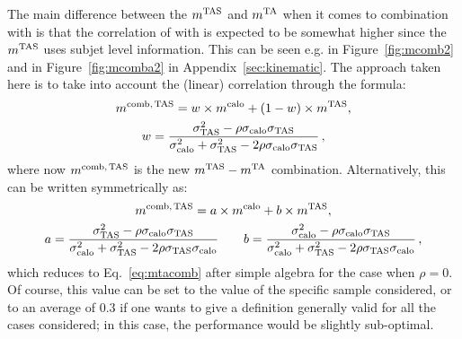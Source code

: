 The main difference between the $m^\textrm{TAS}$ and $m^\textrm{TA}$ when it comes to combination with \mcal is that the correlation of \mtas with \mcal is expected to be somewhat higher since the $m^\textrm{TAS}$ uses subjet level information. This can be seen e.g. in  Figure~\ref{fig:mcomb2} and in Figure~\ref{fig:mcomba2} in Appendix~\ref{sec:kinematic}. The approach taken here is to take into account the (linear) correlation through the formula:
\begin{equation}
\begin{gathered}
m^\textrm{comb,\,TAS}= w\times m^\textrm{calo} + (1-w)\times m^\textrm{TAS},\\
w=\frac{\sigma_\textrm{TAS}^2-\rho\sigma_\textrm{calo}\sigma_\textrm{TAS}}{\sigma_\textrm{calo}^2+\sigma_\textrm{TAS}^2-2\rho\sigma_\textrm{calo}\sigma_\textrm{TAS}}\,,
\end{gathered}
\label{eq:mtascomb}
\end{equation}
% 
where now $m^\textrm{comb,\,TAS}$ is the new $m^\textrm{TAS}-m^\textrm{TA}$ combination. Alternatively, this can be written symmetrically as:
\begin{equation}
\begin{gathered}
m^\textrm{comb,\,TAS}= a\times m^\textrm{calo} + b\times m^\textrm{TAS},\\
a=\frac{\sigma_\textrm{TAS}^2-\rho\sigma_\textrm{calo}\sigma_\textrm{TAS}}{\sigma_\textrm{calo}^2+\sigma_\textrm{TAS}^2-2\rho\sigma_\textrm{TAS}\sigma_\textrm{calo}}\qquad b=\frac{\sigma_\textrm{calo}^2-\rho\sigma_\textrm{calo}\sigma_\textrm{TAS}}{\sigma_\textrm{calo}^2+\sigma_\textrm{TAS}^2-2\rho\sigma_\textrm{TAS}\sigma_\textrm{calo}}\,,
\end{gathered}
\end{equation}
which reduces to Eq.~\eqref{eq:mtacomb} after simple algebra for the case when $\rho=0$. Of course, this value can be set to the value of the specific sample considered, or to an average of 0.3 if one wants to give a definition generally valid for all the cases considered; in this case, the performance would be slightly sub-optimal.

